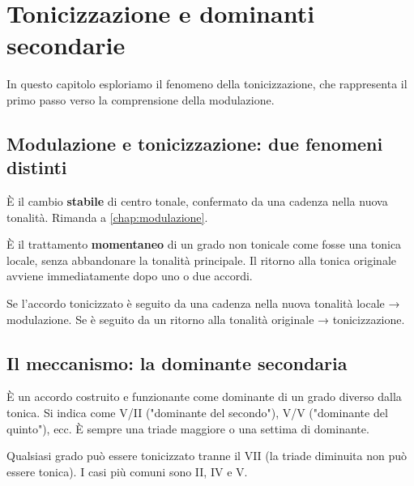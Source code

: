 \chapter{Tonicizzazione e dominanti secondarie}
\label{chap:tonicizzazione}

In questo capitolo esploriamo il fenomeno della tonicizzazione, che rappresenta il primo passo verso la comprensione della modulazione.

\section{Modulazione e tonicizzazione: due fenomeni distinti}
\label{sec:mod_vs_ton}

\begin{definizione}[Modulazione]
    È il cambio \textbf{stabile} di centro tonale, confermato da una cadenza nella nuova tonalità. Rimanda a \ref{chap:modulazione}.
\end{definizione}

\begin{definizione}[Tonicizzazione]
    È il trattamento \textbf{momentaneo} di un grado non tonicale come fosse una tonica locale, senza abbandonare la tonalità principale. Il ritorno alla tonica originale avviene immediatamente dopo uno o due accordi.
\end{definizione}

\begin{regola}
    Se l'accordo tonicizzato è seguito da una cadenza nella nuova tonalità locale → modulazione. Se è seguito da un ritorno alla tonalità originale → tonicizzazione.
\end{regola}

\section{Il meccanismo: la dominante secondaria}
\label{sec:meccanismo_dominante}

\begin{definizione}
    È un accordo costruito e funzionante come dominante di un grado diverso dalla tonica. Si indica come V/II ("dominante del secondo"), V/V ("dominante del quinto"), ecc. È sempre una triade maggiore o una settima di dominante.
\end{definizione}

\begin{regola}
    Qualsiasi grado può essere tonicizzato tranne il VII (la triade diminuita non può essere tonica). I casi più comuni sono II, IV e V.
\end{regola}

